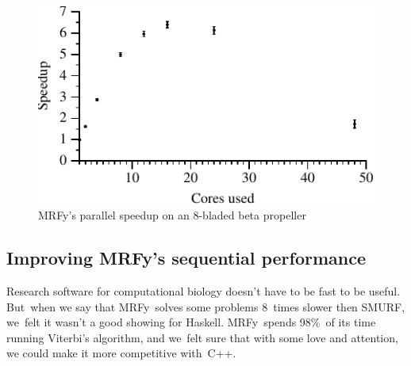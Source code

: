 \documentclass[]{jfp1}
\newcommand\mrfy{MRFy} %
\newcommand\figlabel[1]{\label{fig:#1}}
\begin{document}


\begin{figure}%
\centerline{\includegraphics{speedup}}
\medskip
\caption{\mrfy's parallel speedup on an 8-bladed beta propeller}
\figlabel{speedup}
\end{figure}

%


\subsection{Improving \mrfy's sequential performance}

Research software for
computational biology doesn't have to be fast to be useful.
But~when we say that \mrfy\ solves some problems 8~times slower then
SMURF, we~felt it wasn't a good showing for Haskell.
\mrfy\ spends 98\%\ of its time running Viterbi's algorithm, and
we~felt sure that with some love and attention, we could make it
more competitive with~C++.
\end{document}
